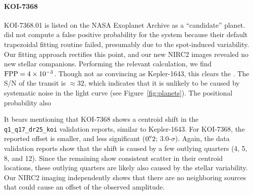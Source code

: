 \documentclass[12pt,twocolumn,tighten,linenumbers]{aastex63}
\begin{document}
\paragraph{KOI-7368}
KOI-7368.01 is listed on the NASA Exoplanet Archive as a ``candidate''
planet.  \citet{morton_false_2016} did not compute a false positive
probability for the system because their default trapezoidal fitting
routine failed, presumably due to the spot-induced variability.  Our
fitting approach rectifies this point, and our new NIRC2 images
revealed no new stellar companions.  Performing the relevant
calculation, we find ${\rm FPP} = 4\times10^{-3}$.  Though not
as convincing as Kepler-1643, this clears the .  The S/N of the transit is
$\approx$$32$, which indicates that it is unlikely to be caused by
systematic noise in the light curve (see Figure~\ref{fig:planets}).
The positional probability also 

It bears mentioning that KOI-7368 shows a centroid shift in the
\texttt{q1\_q17\_dr25\_koi} validation reports, similar to
Kepler-1643.  For KOI-7368, the reported offset is smaller, and less
significant ($0\mbox{$.\!\!^{\prime\prime}$}2$; 3.0-$\sigma$).  Again, the
data validation reports show that the shift is caused by a few
outlying quarters (4, 5, 8, and 12).  Since the remaining
 show
consistent scatter in their centroid locations, these outlying
quarters are likely also caused by the stellar variability.
Our NIRC2 imaging independently shows that there are no neighboring sources that could cause an offset of the observed
amplitude.
\end{document}
